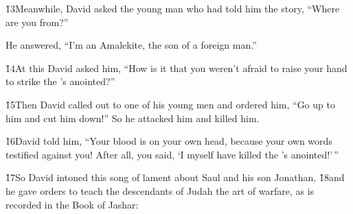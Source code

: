 \v{13}Meanwhile, David asked the young man who had told him the story, ``Where are you from?''

He answered, ``I'm an Amalekite, the son of a foreign man.''

\v{14}At this David asked him, ``How is it that you weren't afraid to raise your hand to strike the 's anointed?''

\v{15}Then David called out to one of his young men and ordered him, ``Go up to him and cut him down!'' So he attacked him and killed him.

\v{16}David told him, ``Your blood is on your own head, because your own words testified against you! After all, you said, `I myself have killed the 's anointed!'\,''

\v{17}So David intoned this song of lament about Saul and his son Jonathan, \v{18}and he gave orders to teach the descendants of Judah the art of warfare, as is recorded in the Book of Jashar:

